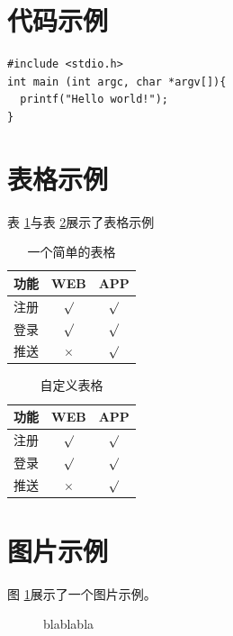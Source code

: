 \documentclass[a4paper,11pt,UTF8]{ctexart}
\begin{document}
\begin{appendix}

\section{代码示例}

\begin{lstlisting}[caption={一段C代码},captionpos=b]
#include <stdio.h>
int main (int argc, char *argv[]){
  printf("Hello world!");
}
\end{lstlisting}

\section{表格示例}
表 \ref{tab:tab1}与表 \ref{tab:tab2}展示了表格示例
\begin{table}[!h!tbp]
\caption{一个简单的表格}\label{tab:tab1}
  \centering
  \begin{tabular}{|l|c|c|}
	\hline
	功能          &WEB         &APP         \\ \hline
	注册          &$\surd$     &$\surd$     \\ \hline
	登录          &$\surd$     &$\surd$     \\ \hline
	推送          &$\times$    &$\surd$     \\ \hline
\end{tabular}
\end{table}

\begin{table}[!h!tbp]
\caption{自定义表格}\label{tab:tab2}
  \centering
\begin{tabular*}{0.75\textwidth}{@{\extracolsep{\fill}}lcc}
    \toprule
    功能          &WEB         &APP         \\
    \midrule
    注册          &$\surd$     &$\surd$     \\
    登录          &$\surd$     &$\surd$     \\
    推送          &$\times$    &$\surd$     \\
    \bottomrule
\end{tabular*}
\end{table}


\section{图片示例}
图 \ref{fig:logo}展示了一个图片示例。
\begin{figure}[htbp]
\centering
{}
\caption{blablabla}
\label{fig:logo}
\end{figure}


\end{appendix}
\end{document}
